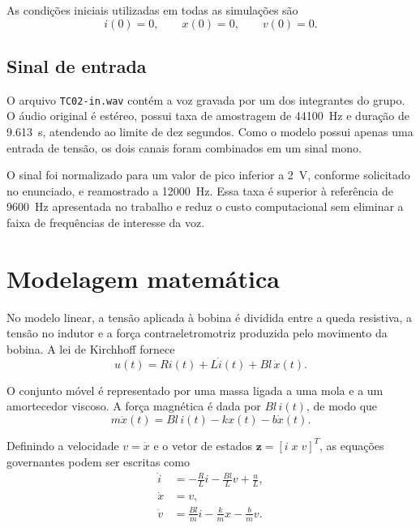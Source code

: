 \documentclass[12pt,letterpaper]{article}
\begin{document}
As condições iniciais utilizadas em todas as simulações são
\begin{equation}
    i(0)=0,\qquad x(0)=0,\qquad v(0)=0.
    \label{eq:condicoes}
\end{equation}

\subsection{Sinal de entrada}

O arquivo \texttt{TC02-in.wav} contém a voz gravada por um dos integrantes do
grupo. O áudio original é estéreo, possui taxa de amostragem de
\SI{44100}{Hz} e duração de \SI{9.613}{s}, atendendo ao limite de dez segundos.
Como o modelo possui apenas uma entrada de tensão, os dois canais foram
combinados em um sinal mono.

O sinal foi normalizado para um valor de pico inferior a \SI{2}{V}, conforme
solicitado no enunciado, e reamostrado a \SI{12000}{Hz}. Essa taxa é superior à
referência de \SI{9600}{Hz} apresentada no trabalho e reduz o custo
computacional sem eliminar a faixa de frequências de interesse da voz.

\section{Modelagem matemática}

No modelo linear, a tensão aplicada à bobina é dividida entre a queda resistiva,
a tensão no indutor e a força contraeletromotriz produzida pelo movimento da
bobina. A lei de Kirchhoff fornece
\begin{equation}
    u(t)=R i(t)+L\dot{i}(t)+Bl\,\dot{x}(t).
    \label{eq:eletrica}
\end{equation}

O conjunto móvel é representado por uma massa ligada a uma mola e a um
amortecedor viscoso. A força magnética é dada por $Bl\,i(t)$, de modo que
\begin{equation}
    m\ddot{x}(t)=Bl\,i(t)-kx(t)-b\dot{x}(t).
    \label{eq:mecanica}
\end{equation}

Definindo a velocidade $v=\dot{x}$ e o vetor de estados
$\mathbf{z}=[i\;x\;v]^{T}$, as equações governantes podem ser escritas como
\begin{equation}
    \begin{aligned}
        \dot{i} &= -\frac{R}{L}i-\frac{Bl}{L}v+\frac{u}{L},\\
        \dot{x} &= v,\\
        \dot{v} &= \frac{Bl}{m}i-\frac{k}{m}x-\frac{b}{m}v.
    \end{aligned}
    \label{eq:estados}
\end{equation}
\end{document}
